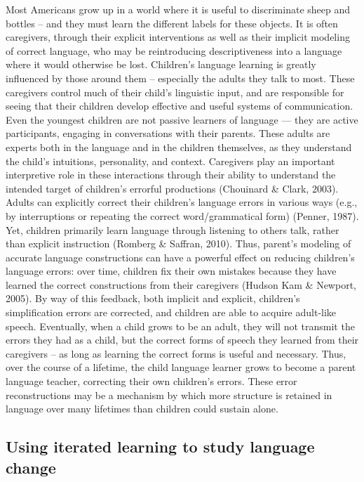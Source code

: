 \documentclass[10pt, letterpaper]{article}
\begin{document}
Most Americans grow up in a world where it is useful to discriminate
sheep and bottles -- and they must learn the different labels for these
objects. It is often caregivers, through their explicit interventions as
well as their implicit modeling of correct language, who may be
reintroducing descriptiveness into a language where it would otherwise
be lost. Children's language learning is greatly influenced by those
around them -- especially the adults they talk to most. These caregivers
control much of their child's linguistic input, and are responsible for
seeing that their children develop effective and useful systems of
communication. Even the youngest children are not passive learners of
language --- they are active participants, engaging in conversations
with their parents. These adults are experts both in the language and in
the children themselves, as they understand the child's intuitions,
personality, and context. Caregivers play an important interpretive role
in these interactions through their ability to understand the intended
target of children's errorful productions (Chouinard \& Clark, 2003).
Adults can explicitly correct their children's language errors in
various ways (e.g., by interruptions or repeating the correct
word/grammatical form) (Penner, 1987). Yet, children primarily learn
language through listening to others talk, rather than explicit
instruction (Romberg \& Saffran, 2010). Thus, parent's modeling of
accurate language constructions can have a powerful effect on reducing
children's language errors: over time, children fix their own mistakes
because they have learned the correct constructions from their
caregivers (Hudson Kam \& Newport, 2005). By way of this feedback, both
implicit and explicit, children's simplification errors are corrected,
and children are able to acquire adult-like speech. Eventually, when a
child grows to be an adult, they will not transmit the errors they had
as a child, but the correct forms of speech they learned from their
caregivers -- as long as learning the correct forms is useful and
necessary. Thus, over the course of a lifetime, the child language
learner grows to become a parent language teacher, correcting their own
children's errors. These error reconstructions may be a mechanism by
which more structure is retained in language over many lifetimes than
children could sustain alone.

\subsection{Using iterated learning to study language
change}\label{using-iterated-learning-to-study-language-change}
\end{document}
